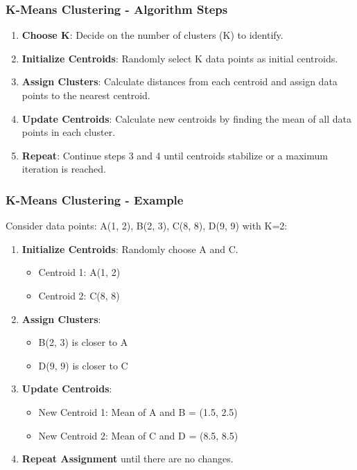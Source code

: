 \documentclass[aspectratio=169]{beamer}
\begin{document}
\begin{frame}[fragile]
    \frametitle{K-Means Clustering - Algorithm Steps}
    \begin{enumerate}
        \item \textbf{Choose K}: Decide on the number of clusters (K) to identify.
        \item \textbf{Initialize Centroids}: Randomly select K data points as initial centroids.
        \item \textbf{Assign Clusters}: Calculate distances from each centroid and assign data points to the nearest centroid.
        \item \textbf{Update Centroids}: Calculate new centroids by finding the mean of all data points in each cluster.
        \item \textbf{Repeat}: Continue steps 3 and 4 until centroids stabilize or a maximum iteration is reached.
    \end{enumerate}
\end{frame}

\begin{frame}[fragile]
    \frametitle{K-Means Clustering - Example}
    Consider data points: A(1, 2), B(2, 3), C(8, 8), D(9, 9) with K=2:
    \begin{enumerate}
        \item \textbf{Initialize Centroids}: Randomly choose A and C.
            \begin{itemize}
                \item Centroid 1: A(1, 2)
                \item Centroid 2: C(8, 8)
            \end{itemize}
        \item \textbf{Assign Clusters}:
            \begin{itemize}
                \item B(2, 3) is closer to A
                \item D(9, 9) is closer to C
            \end{itemize}
        \item \textbf{Update Centroids}:
            \begin{itemize}
                \item New Centroid 1: Mean of A and B = (1.5, 2.5)
                \item New Centroid 2: Mean of C and D = (8.5, 8.5)
            \end{itemize}
        \item \textbf{Repeat Assignment} until there are no changes.
    \end{enumerate}
\end{frame}
\end{document}
